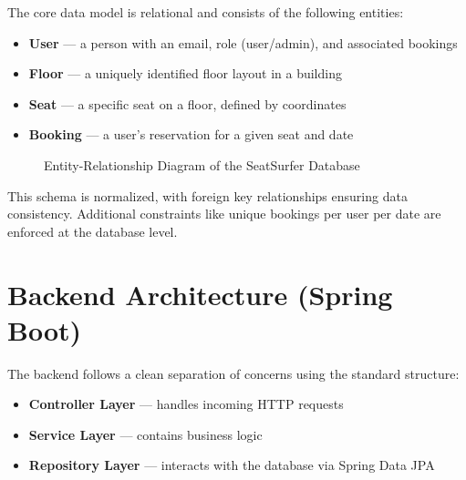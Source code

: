 \documentclass[12pt,a4paper]{report}
\begin{document}
The core data model is relational and consists of the following entities:
\begin{itemize}
    \item \textbf{User} — a person with an email, role (user/admin), and associated bookings
    \item \textbf{Floor} — a uniquely identified floor layout in a building
    \item \textbf{Seat} — a specific seat on a floor, defined by coordinates
    \item \textbf{Booking} — a user's reservation for a given seat and date
\end{itemize}

\begin{figure}[H]
    \centering
    \caption{Entity-Relationship Diagram of the SeatSurfer Database}
    \label{fig:erd}
\end{figure}

This schema is normalized, with foreign key relationships ensuring data consistency. Additional constraints like unique bookings per user per date are enforced at the database level.

\section{Backend Architecture (Spring Boot)}

The backend follows a clean separation of concerns using the standard structure:

\begin{itemize}
    \item \textbf{Controller Layer} — handles incoming HTTP requests
    \item \textbf{Service Layer} — contains business logic
    \item \textbf{Repository Layer} — interacts with the database via Spring Data JPA
\end{itemize}
\end{document}
